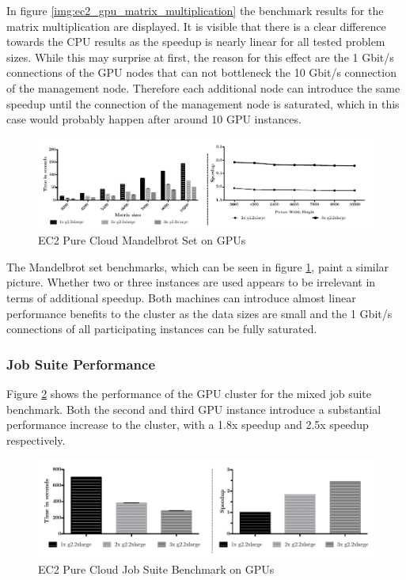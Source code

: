In figure \ref{img:ec2_gpu_matrix_multiplication} the benchmark results for the matrix multiplication are displayed. It is visible that there is a clear difference towards the CPU results as the speedup is nearly linear for all tested problem sizes. While this may surprise at first, the reason for this effect are the 1 Gbit/s connections of the GPU nodes that can not bottleneck the 10 Gbit/s connection of the management node. Therefore each additional node can introduce the same speedup until the connection of the management node is saturated, which in this case would probably happen after around 10 GPU instances.

\begin{figure}[!htb]
	\includegraphics[width=1.0\textwidth]{images/ec2_gpu_mandelbrot.pdf}
	\centering
	\caption{EC2 Pure Cloud Mandelbrot Set on GPUs}
	\label{img:ec2_gpu_mandelbrot}
\end{figure}

The Mandelbrot set benchmarks, which can be seen in figure \ref{img:ec2_gpu_mandelbrot}, paint a similar picture. Whether two or three instances are used appears to be irrelevant in terms of additional speedup. Both machines can introduce almost linear performance benefits to the cluster as the data sizes are small and the 1 Gbit/s connections of all participating instances can be fully saturated.

\subsubsection*{Job Suite Performance}
Figure \ref{img:ec2_gpu_full_benchmark} shows the performance of the GPU cluster for the mixed job suite benchmark. Both the second and third GPU instance introduce a substantial performance increase to the cluster, with a 1.8x speedup and 2.5x speedup respectively.

\begin{figure}[!htb]
	\includegraphics[width=1.0\textwidth]{images/ec2_gpu_full_benchmark.pdf}
	\centering
	\caption{EC2 Pure Cloud Job Suite Benchmark on GPUs}
	\label{img:ec2_gpu_full_benchmark}
\end{figure}

